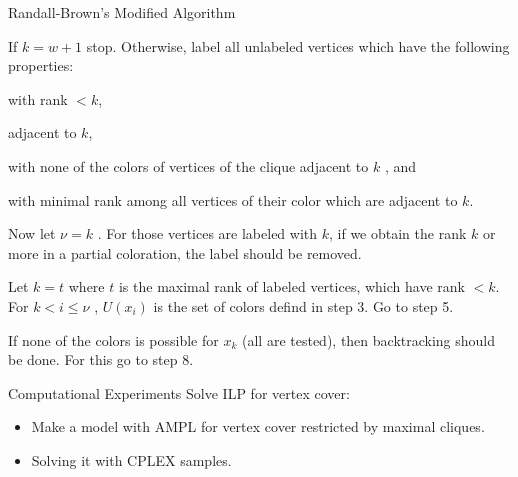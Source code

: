 \documentclass{beamer}
\begin{document}
\begin{frame}{Randall-Brown's Modified Algorithm}
\begin{enumerate}
{\item  If $k = w + 1$ stop. Otherwise, label all unlabeled vertices which have the
following properties:
\begin{enumerate}[(i)]
{\tiny \item with rank $< k$,

\item adjacent to $k$,

\item with none of the colors of vertices of the clique adjacent to $k$ , and
\item with minimal rank among all vertices of their color which are adjacent
to $k$.}
\end{enumerate}
Now let $\nu = k$ . For those vertices are labeled with $k$, if we obtain the rank
$k$ or more in a partial coloration, the label should be removed.\\


\item  Let $k = t$ where $t$ is the maximal rank of labeled vertices, which have rank $< k$. For $k < i \leq \nu$ , $U(x_i)$ is the set of colors defind in step 3. Go to step 5.\\


\item  If none of the colors is possible for $x_k$ (all are tested), then backtracking
should be done. For this go to step 8.\\}
\end{enumerate}

\end{frame}

\begin{frame}{Computational Experiments}
Solve ILP for vertex cover:
\begin{itemize}
\item Make a model with AMPL for vertex cover restricted by maximal cliques.
\item Solving it with CPLEX samples.
\end{itemize}
\end{frame}

\begin{comment}
\begin{frame}[fragile]{AMPL Model for vertex cover restricted to maximal cliques}


\begin{verbatim}
# Declarations
set V;
set E within V cross V;
set Idx;
set Q within Idx cross V;
set cnt within Idx cross V;
var x {v in V} binary;
# integrality constraints.
# Objective Function
minimize cover_size: sum { v in V } x[v];
# Constraints
subject to clique {c in Idx}:
sum {(a, b) in Q: a=c} x[b] >= card{(a,b) in Q: a=c}-1;
\end{verbatim}

\end{frame}
\end{comment}
\end{document}
